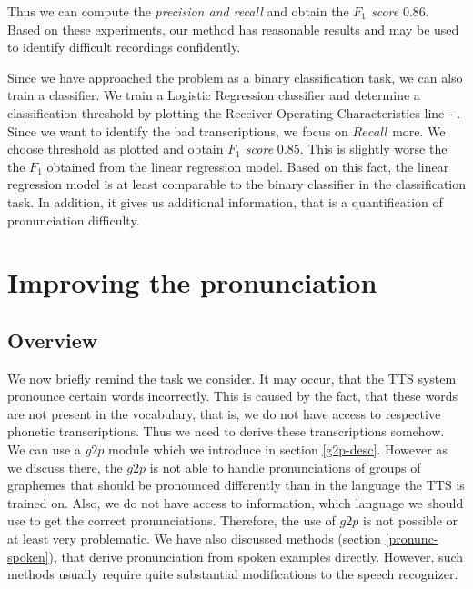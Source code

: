 \par
Thus we can compute the \textit{precision and recall} and obtain the \textit{$F_1$ score} 0.86.
Based on these experiments, our method has reasonable results and may be used to identify difficult recordings confidently.
\par
Since we have approached the problem as a binary classification task, we can also train a classifier.
We train a Logistic Regression classifier and determine a classification threshold by plotting the Receiver Operating Characteristics line - .
Since we want to identify the bad transcriptions, we focus on $Recall$ more.
We choose threshold as plotted and obtain \textit{$F_1$ score} 0.85.
This is slightly worse the the \textit{$F_1$} obtained from the linear regression model.
Based on this fact, the linear regression model is at least comparable to the binary classifier in the classification task.
In addition, it gives us additional information, that is a quantification of pronunciation difficulty.
\section{Improving the pronunciation}
\label{pron-improvement}
\subsection{Overview}
We now briefly remind the task we consider.
It may occur, that the TTS system pronounce certain words incorrectly.
This is caused by the fact, that these words are not present in the vocabulary, that is, we do not have access to respective phonetic transcriptions.
Thus we need to derive these transcriptions somehow.
We can use a $g2p$ module which we introduce in section \ref{g2p-desc}.
However as we discuss there, the $g2p$ is not able to handle pronunciations of groups of graphemes that should be pronounced differently than in the language the TTS is trained on.
Also, we do not have access to information, which language we should use to get the correct pronunciations.
Therefore, the use of $g2p$ is not possible or at least very problematic.
We have also discussed methods (section \ref{pronunc-spoken}), that derive pronunciation from spoken examples directly.
However, such methods usually require quite substantial modifications to the speech recognizer.
